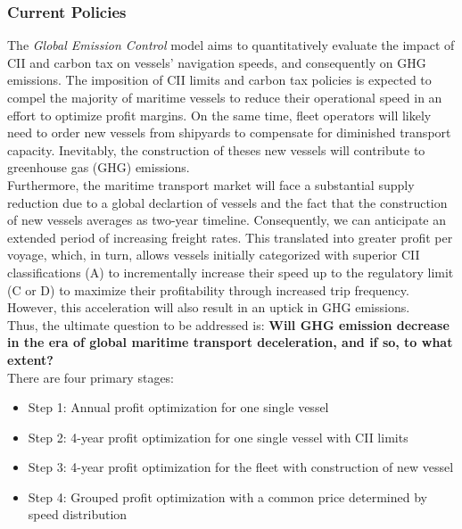 \documentclass[a4paper,12pt]{article}
\begin{document}
\subsubsection{Current Policies}
The \textit{Global Emission Control} model aims to quantitatively evaluate the impact of CII and carbon tax on vessels' navigation speeds, and consequently on GHG emissions.
The imposition of CII limits and carbon tax policies is expected to compel the majority of maritime vessels to reduce their operational speed in an effort to optimize profit margins.
On the same time, fleet operators will likely need to order new vessels from shipyards to compensate for diminished transport capacity.
Inevitably, the construction of theses new vessels will contribute to greenhouse gas (GHG) emissions.\\

Furthermore, the maritime transport market will face a substantial supply reduction due to a global declartion of vessels and the fact that the construction of new vessels averages as two-year timeline.
Consequently, we can anticipate an extended period of increasing freight rates.
This translated into greater profit per voyage, which, in turn, allows vessels initially categorized with superior CII classifications (A) to incrementally increase their speed up to the regulatory limit (C or D) to maximize their profitability through increased trip frequency.
However, this acceleration will also result in an uptick in GHG emissions.\\

Thus, the ultimate question to be addressed is: \textbf{Will GHG emission decrease in the era of global maritime transport deceleration, and if so, to what extent?}\\

There are four primary stages:
\begin{itemize}
	\item Step 1: Annual profit optimization for one single vessel
	\item Step 2: 4-year profit optimization for one single vessel with CII limits
	\item Step 3: 4-year profit optimization for the fleet with construction of new vessel
	\item Step 4: Grouped profit optimization with a common price determined by speed distribution \\
\end{itemize}
\end{document}
